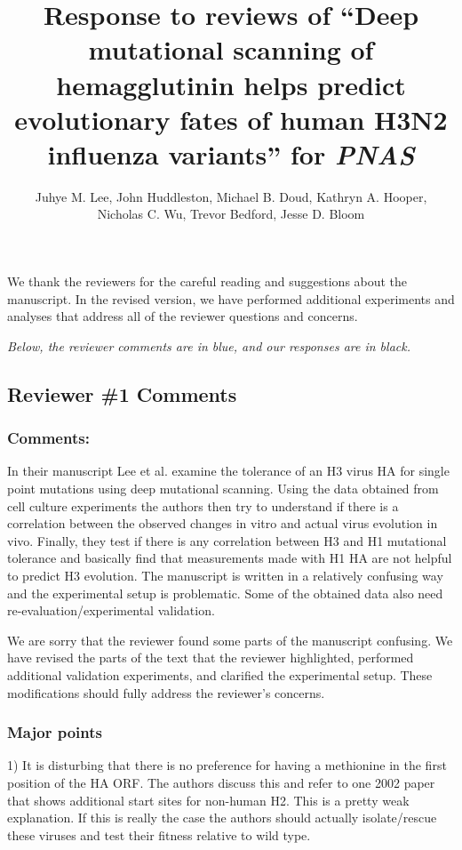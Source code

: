 \documentclass[11pt, oneside]{article}   	%
\title{Response to reviews of ``Deep mutational scanning of hemagglutinin helps predict evolutionary fates of human H3N2 influenza variants'' for \textit{PNAS}}
\author{Juhye M. Lee, John Huddleston, Michael B. Doud, Kathryn A. Hooper,\\Nicholas C. Wu, Trevor Bedford, Jesse D. Bloom}
\newcommand{\response}[1]{{\color{black}#1}}
\begin{document}
\maketitle

We thank the reviewers for the careful reading and suggestions about the manuscript.
In the revised version, we have performed additional experiments and analyses that address all of the reviewer questions and concerns.

\emph{Below, the reviewer comments {\color{blue} are in blue}, and our responses are in black.}

\color{blue}

\subsection*{Reviewer \#1 Comments}

\subsubsection*{Comments:} 
In their manuscript Lee et al. examine the tolerance of an H3 virus HA for single point mutations using deep mutational scanning. Using the data obtained from cell culture experiments the authors then try to understand if there is a correlation between the observed changes in vitro and actual virus evolution in vivo. Finally, they test if there is any correlation between H3 and H1 mutational tolerance and basically find that measurements made with H1 HA are not helpful to predict H3 evolution. The manuscript is written in a relatively confusing way and the experimental setup is problematic. Some of the obtained data also need re-evaluation/experimental validation. 

\response{We are sorry that the reviewer found some parts of the manuscript confusing.
We have revised the parts of the text that the reviewer highlighted, performed additional validation experiments, and clarified the experimental setup.
These modifications should fully address the reviewer's concerns.}

\subsubsection*{Major points} 

1) It is disturbing that there is no preference for having a methionine in the first position of the HA ORF. The authors discuss this and refer to one 2002 paper that shows additional start sites for non-human H2. This is a pretty weak explanation. If this is really the case the authors should actually isolate/rescue these viruses and test their fitness relative to wild type. 
\end{document}
